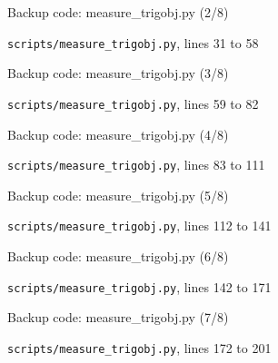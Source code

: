 \begin{frame}{Backup code: measure\_trigobj.py (2/8)}
  \vspace{0pt}\par
  {\tiny\color{lightgrey}\texttt{scripts/measure\_trigobj.py}, lines 31 to 58\par}
  
\end{frame}
\begin{frame}{Backup code: measure\_trigobj.py (3/8)}
  \vspace{0pt}\par
  {\tiny\color{lightgrey}\texttt{scripts/measure\_trigobj.py}, lines 59 to 82\par}
  
\end{frame}
\begin{frame}{Backup code: measure\_trigobj.py (4/8)}
  \vspace{0pt}\par
  {\tiny\color{lightgrey}\texttt{scripts/measure\_trigobj.py}, lines 83 to 111\par}
  
\end{frame}
\begin{frame}{Backup code: measure\_trigobj.py (5/8)}
  \vspace{0pt}\par
  {\tiny\color{lightgrey}\texttt{scripts/measure\_trigobj.py}, lines 112 to 141\par}
  
\end{frame}
\begin{frame}{Backup code: measure\_trigobj.py (6/8)}
  \vspace{0pt}\par
  {\tiny\color{lightgrey}\texttt{scripts/measure\_trigobj.py}, lines 142 to 171\par}
  
\end{frame}
\begin{frame}{Backup code: measure\_trigobj.py (7/8)}
  \vspace{0pt}\par
  {\tiny\color{lightgrey}\texttt{scripts/measure\_trigobj.py}, lines 172 to 201\par}
  
\end{frame}
